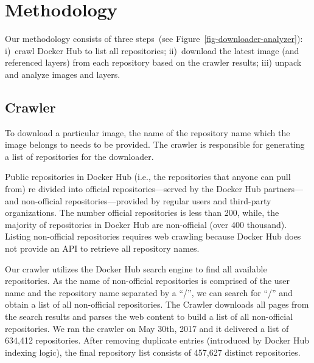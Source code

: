 \section{Methodology}
\label{sec:methodology}


Our methodology consists of three steps~(see Figure~\ref{fig-downloader-analyzer}):
i)~crawl Docker Hub to list all repositories;
ii)~download the latest image (and referenced layers) from each repository based
on the crawler results; iii) unpack and analyze images and layers.



\subsection{Crawler}
\label{sec:crawler}


To download a particular image, %
the name of the repository name which the image belongs to needs to be provided.
The crawler is responsible for generating a list of repositories for the downloader.

Public repositories 
in Docker Hub
(i.e., the repositories
that anyone can pull from)
re divided into official
repositories---served by the Docker Hub partners---and non-official
repositories---provided by regular users and third-party organizations.
%
The number official repositories is less than 200, while, the majority
of repositories in Docker Hub are non-official (over 400 thousand).
Listing non-official repositories requires web crawling because
Docker Hub does not provide an API to retrieve all repository names.

Our crawler utilizes the Docker Hub search engine to find all available
repositories.
%
As the name of non-official repositories is comprised
of the user name and the repository name separated by a ``/'', %
we can search for ``/'' and obtain a list of all non-official repositories.
The Crawler downloads all pages from the search results and parses the web content
to build a list of all non-official repositories.
We ran the crawler on May 30th, 2017 and it delivered a list of 634,412 repositories.
%
%
After removing duplicate entries (introduced by Docker Hub indexing logic),
the final repository list consists of 457,627
distinct repositories. 

